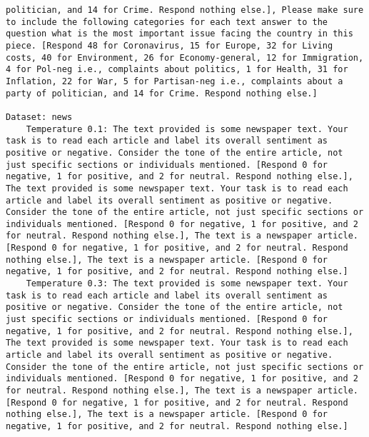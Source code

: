 \begin{lstlisting}[label=lst:poor_performing_prompts]
politician, and 14 for Crime. Respond nothing else.], Please make sure to include the following categories for each text answer to the question what is the most important issue facing the country in this piece. [Respond 48 for Coronavirus, 15 for Europe, 32 for Living costs, 40 for Environment, 26 for Economy-general, 12 for Immigration, 4 for Pol-neg i.e., complaints about politics, 1 for Health, 31 for Inflation, 22 for War, 5 for Partisan-neg i.e., complaints about a party of politician, and 14 for Crime. Respond nothing else.]

Dataset: news
	Temperature 0.1: The text provided is some newspaper text. Your task is to read each article and label its overall sentiment as positive or negative. Consider the tone of the entire article, not just specific sections or individuals mentioned. [Respond 0 for negative, 1 for positive, and 2 for neutral. Respond nothing else.], The text provided is some newspaper text. Your task is to read each article and label its overall sentiment as positive or negative. Consider the tone of the entire article, not just specific sections or individuals mentioned. [Respond 0 for negative, 1 for positive, and 2 for neutral. Respond nothing else.], The text is a newspaper article. [Respond 0 for negative, 1 for positive, and 2 for neutral. Respond nothing else.], The text is a newspaper article. [Respond 0 for negative, 1 for positive, and 2 for neutral. Respond nothing else.]
	Temperature 0.3: The text provided is some newspaper text. Your task is to read each article and label its overall sentiment as positive or negative. Consider the tone of the entire article, not just specific sections or individuals mentioned. [Respond 0 for negative, 1 for positive, and 2 for neutral. Respond nothing else.], The text provided is some newspaper text. Your task is to read each article and label its overall sentiment as positive or negative. Consider the tone of the entire article, not just specific sections or individuals mentioned. [Respond 0 for negative, 1 for positive, and 2 for neutral. Respond nothing else.], The text is a newspaper article. [Respond 0 for negative, 1 for positive, and 2 for neutral. Respond nothing else.], The text is a newspaper article. [Respond 0 for negative, 1 for positive, and 2 for neutral. Respond nothing else.]

\end{lstlisting}
